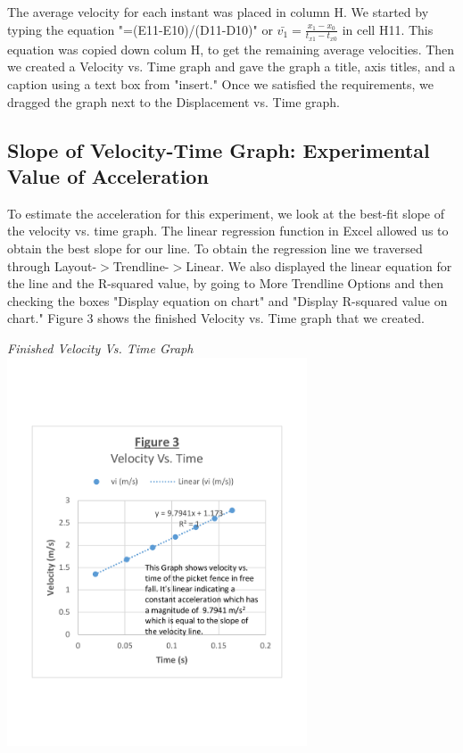 \documentclass[aps,letterpaper,11pt]{revtex4}
\begin{document}
{The average velocity for each instant was placed in column H. We started by typing the equation "=(E11-E10)/(D11-D10)" or $\bar{v_1}=\frac{x_1-x_0}{t_{x1}-t_{x0}}$ in cell H11. This equation was copied down colum H, to get the remaining average velocities. Then we created a Velocity vs. Time graph and gave the graph a title, axis titles, and a caption using a text box from "insert." Once we satisfied the requirements, we dragged the graph next to the Displacement vs. Time graph.

\subsection{Slope of Velocity-Time Graph: Experimental Value of Acceleration}

To estimate the acceleration for this experiment, we look at the best-fit slope of the velocity vs. time graph. The linear regression function in Excel allowed us to obtain the best slope for our line. To obtain the regression line we traversed through Layout-$>$Trendline-$>$Linear. We also displayed the linear equation for the line and the R-squared value, by going to More Trendline Options and then checking the boxes "Display equation on chart" and "Display R-squared value on chart." Figure 3 shows the finished Velocity vs. Time graph that we created.

\newpage

\begin{center}
\textit{Finished Velocity Vs. Time Graph}\\
\vspace{-10mm}
\includegraphics[width=3.5in]{VelocityVsTimeGraph.pdf}
\end{center} 

}
\end{document}
